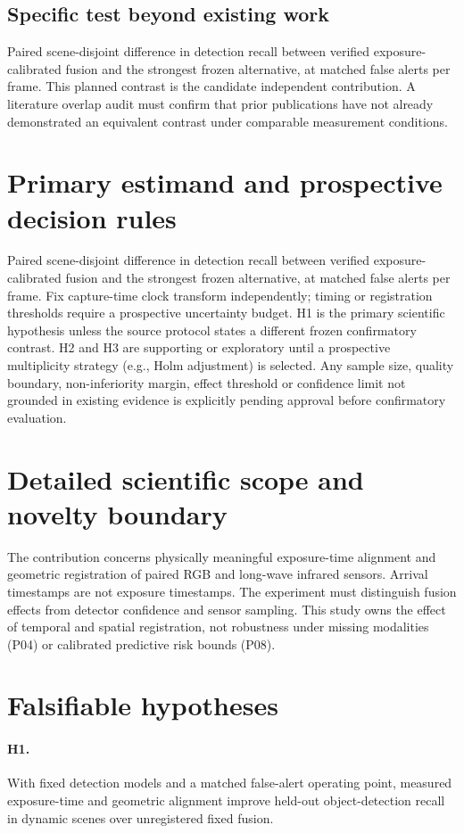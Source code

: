 \documentclass[11pt,a4paper]{article}
\begin{document}
\subsection{Specific test beyond existing work}
Paired scene-disjoint difference in detection recall between verified exposure-calibrated fusion and the strongest frozen alternative, at matched false alerts per frame. This planned contrast is the candidate independent contribution. A literature overlap audit must confirm that prior publications have not already demonstrated an equivalent contrast under comparable measurement conditions.

\section{Primary estimand and prospective decision rules}
Paired scene-disjoint difference in detection recall between verified exposure-calibrated fusion and the strongest frozen alternative, at matched false alerts per frame. Fix capture-time clock transform independently; timing or registration thresholds require a prospective uncertainty budget. H1 is the primary scientific hypothesis unless the source protocol states a different frozen confirmatory contrast. H2 and H3 are supporting or exploratory until a prospective multiplicity strategy (e.g., Holm adjustment) is selected. Any sample size, quality boundary, non-inferiority margin, effect threshold or confidence limit not grounded in existing evidence is explicitly pending approval before confirmatory evaluation.

\section{Detailed scientific scope and novelty boundary}
The contribution concerns physically meaningful exposure-time alignment and geometric registration of paired RGB and long-wave infrared sensors. Arrival timestamps are not exposure timestamps. The experiment must distinguish fusion effects from detector confidence and sensor sampling. This study owns the effect of temporal and spatial registration, not robustness under missing modalities (P04) or calibrated predictive risk bounds (P08).

\section{Falsifiable hypotheses}
\paragraph{H1.} With fixed detection models and a matched false-alert operating point, measured exposure-time and geometric alignment improve held-out object-detection recall in dynamic scenes over unregistered fixed fusion.
\end{document}
